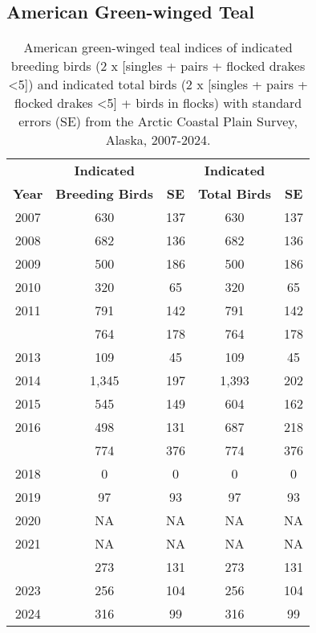 \documentclass[
]{article}
\begin{document}
\newpage{}

\subsection*{American Green-winged
Teal}\label{american-green-winged-teal-1}

\begingroup\fontsize{10}{12}\selectfont

\begin{longtable}[t]{ccccc}

\caption{\label{tbl-GWTE}American green-winged teal indices of indicated
breeding birds (2 x {[}singles + pairs + flocked drakes \textless5{]})
and indicated total birds (2 x {[}singles + pairs + flocked drakes
\textless5{]} + birds in flocks) with standard errors (SE) from the
Arctic Coastal Plain Survey, Alaska, 2007-2024.}

\tabularnewline

\\
\toprule
\multicolumn{1}{c}{\textbf{ }} & \multicolumn{1}{c}{\textbf{Indicated}} & \multicolumn{1}{c}{\textbf{ }} & \multicolumn{1}{c}{\textbf{Indicated}} & \multicolumn{1}{c}{\textbf{ }} \\
\cmidrule(l{3pt}r{3pt}){2-2} \cmidrule(l{3pt}r{3pt}){4-4}
\textbf{Year} & \textbf{Breeding Birds} & \textbf{SE} & \textbf{Total Birds} & \textbf{SE}\\
\midrule
2007 & 630 & 137 & 630 & 137\\
2008 & 682 & 136 & 682 & 136\\
2009 & 500 & 186 & 500 & 186\\
2010 & 320 & 65 & 320 & 65\\
2011 & 791 & 142 & 791 & 142\\
\addlinespace
2012 & 764 & 178 & 764 & 178\\
2013 & 109 & 45 & 109 & 45\\
2014 & 1,345 & 197 & 1,393 & 202\\
2015 & 545 & 149 & 604 & 162\\
2016 & 498 & 131 & 687 & 218\\
\addlinespace
2017 & 774 & 376 & 774 & 376\\
2018 & 0 & 0 & 0 & 0\\
2019 & 97 & 93 & 97 & 93\\
2020 & NA & NA & NA & NA\\
2021 & NA & NA & NA & NA\\
\addlinespace
2022 & 273 & 131 & 273 & 131\\
2023 & 256 & 104 & 256 & 104\\
2024 & 316 & 99 & 316 & 99\\
\bottomrule

\end{longtable}
\end{document}
